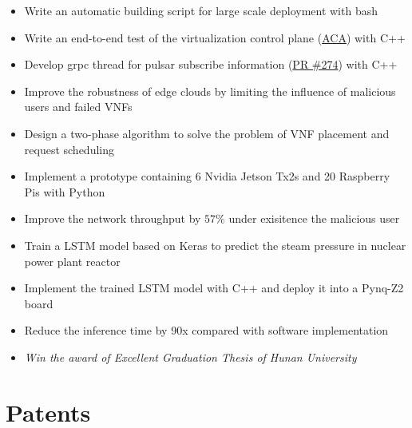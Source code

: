 \documentclass{resume}
\begin{document}
\begin{itemize}
  \item Write an automatic building script for large scale deployment with bash
  \item Write an end-to-end test of the virtualization control plane (\href{https://github.com/futurewei-cloud/alcor-control-agent}{ACA}) with C++
  \item Develop grpc thread for pulsar subscribe information (\href{https://github.com/futurewei-cloud/alcor-control-agent/pull/274}{PR \#274}) with C++
\end{itemize}

\begin{itemize}
  \item Improve the robustness of edge clouds by limiting the influence of malicious users and failed VNFs
  \item Design a two-phase algorithm to solve the problem of VNF placement and request scheduling
  \item Implement a prototype containing 6 Nvidia Jetson Tx2s and 20 Raspberry Pis with Python
  \item Improve the network throughput by $57\%$ under exisitence the malicious user
\end{itemize}

\begin{itemize}
  \item Train a LSTM model based on Keras to predict the steam pressure in nuclear power plant reactor
  \item Implement the trained LSTM model with C++ and deploy it into a Pynq-Z2 board
  \item Reduce the inference time by 90x compared with software implementation
  \item \textit{Win the award of Excellent Graduation Thesis of Hunan University}
\end{itemize}

\section{Patents}
\end{document}
